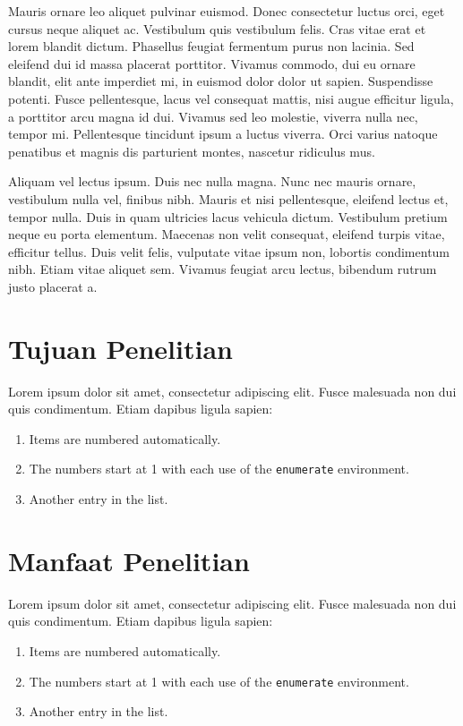     Mauris ornare leo aliquet pulvinar euismod. Donec consectetur luctus orci, eget cursus neque aliquet ac. Vestibulum quis vestibulum felis. Cras vitae erat et lorem blandit dictum. Phasellus feugiat fermentum purus non lacinia. Sed eleifend dui id massa placerat porttitor. Vivamus commodo, dui eu ornare blandit, elit ante imperdiet mi, in euismod dolor dolor ut sapien. Suspendisse potenti. Fusce pellentesque, lacus vel consequat mattis, nisi augue efficitur ligula, a porttitor arcu magna id dui. Vivamus sed leo molestie, viverra nulla nec, tempor mi. Pellentesque tincidunt ipsum a luctus viverra. Orci varius natoque penatibus et magnis dis parturient montes, nascetur ridiculus mus.\par

    Aliquam vel lectus ipsum. Duis nec nulla magna. Nunc nec mauris ornare, vestibulum nulla vel, finibus nibh. Mauris et nisi pellentesque, eleifend lectus et, tempor nulla. Duis in quam ultricies lacus vehicula dictum. Vestibulum pretium neque eu porta elementum. Maecenas non velit consequat, eleifend turpis vitae, efficitur tellus. Duis velit felis, vulputate vitae ipsum non, lobortis condimentum nibh. Etiam vitae aliquet sem. Vivamus feugiat arcu lectus, bibendum rutrum justo placerat a.\\

\section{Tujuan Penelitian}
    Lorem ipsum dolor sit amet, consectetur adipiscing elit. Fusce malesuada non dui quis condimentum. Etiam dapibus ligula sapien:
    \begin{enumerate}
        \item Items are numbered automatically.
        \item The numbers start at 1 with each use of the \texttt{enumerate} environment.
        \item Another entry in the list.\\
    \end{enumerate} 

\section{Manfaat Penelitian}
    Lorem ipsum dolor sit amet, consectetur adipiscing elit. Fusce malesuada non dui quis condimentum. Etiam dapibus ligula sapien:
    \begin{enumerate}
        \item Items are numbered automatically.
        \item The numbers start at 1 with each use of the \texttt{enumerate} environment.
        \item Another entry in the list.
    \end{enumerate} 
    
